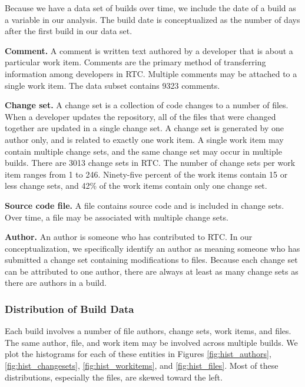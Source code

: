 Because we have a data set of builds over time, we include the date of a build as a variable in our analysis. The build date is conceptualized as the number of days after the first build in our data set.

\textbf{Comment.} A comment is written text authored by a developer that is about a particular work item. Comments are the primary method of transferring information among developers in RTC. Multiple comments may be attached to a single work item. The data subset contains 9323 comments.

\textbf{Change set.} A change set is a collection of code changes to a number of files. When a developer updates the repository, all of the files that were changed together are updated in a single change set. A change set is generated by one author only, and is related to exactly one work item. A single work item may contain multiple change sets, and the same change set may occur in multiple builds. There are 3013 change sets in RTC. The number of change sets per work item ranges from 1 to 246. Ninety-five percent of the work items contain 15 or less change sets, and 42\% of the work items contain only one change set.

\textbf{Source code file.} A file contains source code and is included in change sets. Over time, a file may be associated with multiple change sets.

\textbf{Author.} An author is someone who has contributed to RTC. In our conceptualization, we specifically identify an author as meaning someone who has submitted a change set containing modifications to files. Because each change set can be attributed to one author, there are always at least as many change sets as there are authors in a build.


\subsubsection{Distribution of Build Data}
Each build involves a number of file authors, change sets, work items, and files. The same author, file, and work item may be involved across multiple builds.
We plot the histograms for each of these entities in Figures \ref{fig:hist_authors}, \ref{fig:hist_changesets}, \ref{fig:hist_workitems}, and \ref{fig:hist_files}.
Most of these distributions, especially the files, are skewed toward the left. 


